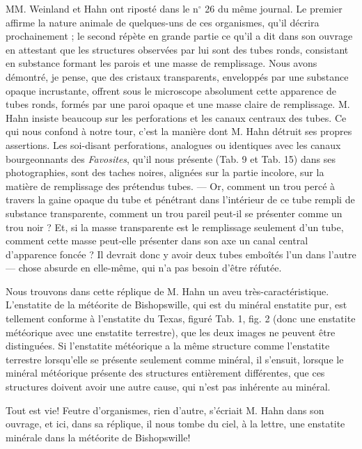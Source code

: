 \documentclass[a4paper, 12pt, oneside, french]{article}
\begin{document}
MM. Weinland et Hahn ont riposté dans le n$^{\circ}$ 26 du même journal. Le premier affirme la nature animale de quelques-uns de ces organismes, qu'il décrira prochainement ; le second répète en grande partie ce qu'il a dit dans son ouvrage en attestant que les structures observées par lui sont des tubes ronds, consistant en \og substance formant les parois et une masse de remplissage. \fg Nous avons démontré, je pense, que des cristaux transparents, enveloppés par une substance opaque incrustante, offrent sous le microscope absolument cette apparence de tubes ronds, formés par une paroi opaque et une masse claire de remplissage. M. Hahn insiste beaucoup sur les perforations et les canaux centraux des tubes. Ce qui nous confond à notre tour, c'est la manière dont M. Hahn détruit ses propres assertions. Les soi-disant perforations, analogues ou identiques avec les canaux bourgeonnants des \emph{Favosites}, qu'il nous présente (Tab. 9 et Tab. 15) dans ses photographies, sont des taches noires, alignées sur la partie incolore, sur la matière de remplissage des prétendus tubes. --- Or, comment un trou percé à travers la gaine opaque du tube et pénétrant dans l'intérieur de ce tube rempli de substance transparente, comment un trou pareil peut-il se présenter comme un trou noir ? Et, si la masse transparente est le remplissage seulement d'un tube, comment cette masse peut-elle présenter dans son axe un canal central d'apparence foncée ? Il devrait donc y avoir deux tubes emboîtés l'un dans l'autre --- chose absurde en elle-même, qui n'a pas besoin d'être réfutée.

Nous trouvons dans cette réplique de M. Hahn un aveu très-caractéristique. \og L'enstatite de la météorite de Bishopswille, qui est du minéral enstatite pur, est tellement conforme à l'enstatite du Texas, figuré Tab. 1, fig. 2 (donc une enstatite météorique avec une enstatite terrestre), que les deux images ne peuvent être distinguées. Si l'enstatite météorique a la même structure comme l'enstatite terrestre lorsqu'elle se présente seulement comme minéral, il s'ensuit, lorsque le minéral météorique présente des structures entièrement différentes, que ces structures doivent avoir une autre cause, qui n'est pas inhérente au minéral. \fg

\og Tout est vie! Feutre d'organismes, rien d'autre, \fg s'écriait M. Hahn dans son ouvrage, et ici, dans sa réplique, il nous tombe du ciel, à la lettre, une enstatite minérale dans la météorite de Bishopswille!
\end{document}

